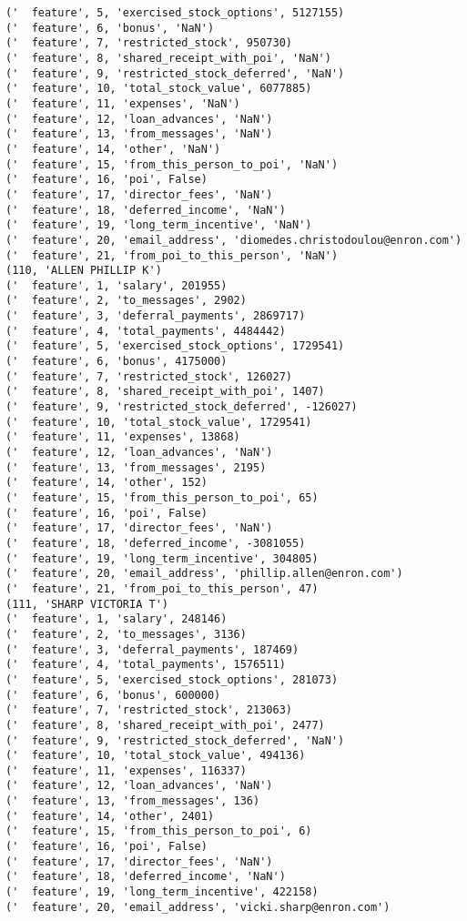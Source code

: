 \begin{verbatim}
('  feature', 5, 'exercised_stock_options', 5127155)
('  feature', 6, 'bonus', 'NaN')
('  feature', 7, 'restricted_stock', 950730)
('  feature', 8, 'shared_receipt_with_poi', 'NaN')
('  feature', 9, 'restricted_stock_deferred', 'NaN')
('  feature', 10, 'total_stock_value', 6077885)
('  feature', 11, 'expenses', 'NaN')
('  feature', 12, 'loan_advances', 'NaN')
('  feature', 13, 'from_messages', 'NaN')
('  feature', 14, 'other', 'NaN')
('  feature', 15, 'from_this_person_to_poi', 'NaN')
('  feature', 16, 'poi', False)
('  feature', 17, 'director_fees', 'NaN')
('  feature', 18, 'deferred_income', 'NaN')
('  feature', 19, 'long_term_incentive', 'NaN')
('  feature', 20, 'email_address', 'diomedes.christodoulou@enron.com')
('  feature', 21, 'from_poi_to_this_person', 'NaN')
(110, 'ALLEN PHILLIP K')
('  feature', 1, 'salary', 201955)
('  feature', 2, 'to_messages', 2902)
('  feature', 3, 'deferral_payments', 2869717)
('  feature', 4, 'total_payments', 4484442)
('  feature', 5, 'exercised_stock_options', 1729541)
('  feature', 6, 'bonus', 4175000)
('  feature', 7, 'restricted_stock', 126027)
('  feature', 8, 'shared_receipt_with_poi', 1407)
('  feature', 9, 'restricted_stock_deferred', -126027)
('  feature', 10, 'total_stock_value', 1729541)
('  feature', 11, 'expenses', 13868)
('  feature', 12, 'loan_advances', 'NaN')
('  feature', 13, 'from_messages', 2195)
('  feature', 14, 'other', 152)
('  feature', 15, 'from_this_person_to_poi', 65)
('  feature', 16, 'poi', False)
('  feature', 17, 'director_fees', 'NaN')
('  feature', 18, 'deferred_income', -3081055)
('  feature', 19, 'long_term_incentive', 304805)
('  feature', 20, 'email_address', 'phillip.allen@enron.com')
('  feature', 21, 'from_poi_to_this_person', 47)
(111, 'SHARP VICTORIA T')
('  feature', 1, 'salary', 248146)
('  feature', 2, 'to_messages', 3136)
('  feature', 3, 'deferral_payments', 187469)
('  feature', 4, 'total_payments', 1576511)
('  feature', 5, 'exercised_stock_options', 281073)
('  feature', 6, 'bonus', 600000)
('  feature', 7, 'restricted_stock', 213063)
('  feature', 8, 'shared_receipt_with_poi', 2477)
('  feature', 9, 'restricted_stock_deferred', 'NaN')
('  feature', 10, 'total_stock_value', 494136)
('  feature', 11, 'expenses', 116337)
('  feature', 12, 'loan_advances', 'NaN')
('  feature', 13, 'from_messages', 136)
('  feature', 14, 'other', 2401)
('  feature', 15, 'from_this_person_to_poi', 6)
('  feature', 16, 'poi', False)
('  feature', 17, 'director_fees', 'NaN')
('  feature', 18, 'deferred_income', 'NaN')
('  feature', 19, 'long_term_incentive', 422158)
('  feature', 20, 'email_address', 'vicki.sharp@enron.com')

\end{verbatim}
